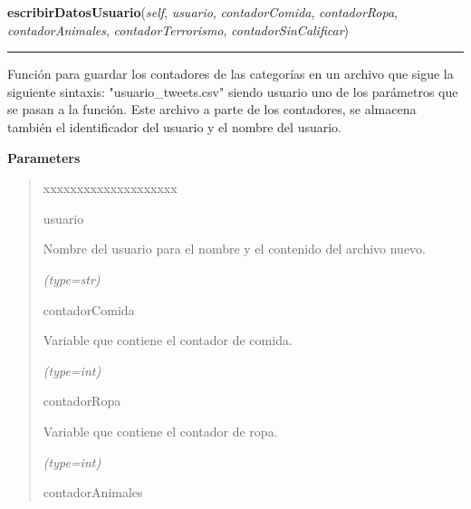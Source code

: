     \label{funcionesTwitter:FuncionesTwitter:escribirDatosUsuario}

    \vspace{0.5ex}

\hspace{.8\funcindent}\begin{boxedminipage}{\funcwidth}

    \raggedright \textbf{escribirDatosUsuario}(\textit{self}, \textit{usuario}, \textit{contadorComida}, \textit{contadorRopa}, \textit{contadorAnimales}, \textit{contadorTerrorismo}, \textit{contadorSinCalificar})

    \vspace{-1.5ex}

    \rule{\textwidth}{0.5\fboxrule}
\setlength{\parskip}{2ex}
    Función para guardar los contadores de las categorías en un archivo que
    sigue la siguiente sintaxis: "usuario\_tweets.csv" siendo usuario uno 
    de los parámetros que se pasan a la función. Este archivo a parte de 
    los contadores, se almacena también el identificador del usuario y el 
    nombre del usuario.

\setlength{\parskip}{1ex}
      \textbf{Parameters}
      \vspace{-1ex}

      \begin{quote}
        \begin{Ventry}{xxxxxxxxxxxxxxxxxxxx}

          \item[usuario]

          Nombre del usuario para el nombre y el contenido del archivo 
          nuevo.

            {\it (type=str)}

          \item[contadorComida]

          Variable que contiene el contador de comida.

            {\it (type=int)}

          \item[contadorRopa]

          Variable que contiene el contador de ropa.

            {\it (type=int)}

          \item[contadorAnimales]


\end{Ventry}
\end{quote}
\end{boxedminipage}
